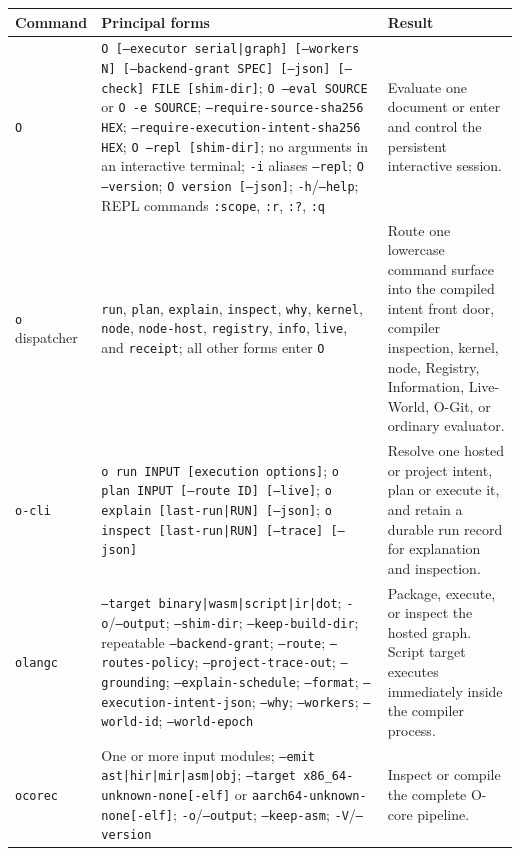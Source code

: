 \documentclass[11pt,oneside]{article}
\begin{document}
\begin{longtable}{P{0.18\textwidth} P{0.42\textwidth} P{0.32\textwidth}}
\toprule
\textbf{Command} & \textbf{Principal forms} & \textbf{Result} \\
\midrule
\endhead
\texttt{O} & \texttt{O [--executor serial|graph] [--workers N]
[--backend-grant SPEC] [--json] [--check] FILE [shim-dir]};
\texttt{O --eval SOURCE} or \texttt{O -e SOURCE};
\texttt{--require-source-sha256 HEX};
\texttt{--require-execution-intent-sha256 HEX};
\texttt{O --repl [shim-dir]}; no arguments in an interactive terminal;
\texttt{-i} aliases \texttt{--repl}; \texttt{O --version};
\texttt{O version [--json]}; \texttt{-h}/\texttt{--help}; REPL commands
\texttt{:scope}, \texttt{:r}, \texttt{:?}, \texttt{:q} &
Evaluate one document or enter and control the persistent interactive session. \\
\texttt{o} dispatcher &
\texttt{run}, \texttt{plan}, \texttt{explain}, \texttt{inspect},
\texttt{why}, \texttt{kernel}, \texttt{node}, \texttt{node-host},
\texttt{registry}, \texttt{info}, \texttt{live}, and \texttt{receipt};
all other forms enter \texttt{O} &
Route one lowercase command surface into the compiled intent front door,
compiler inspection, kernel, node, Registry, Information, Live-World, O-Git,
or ordinary evaluator. \\
\texttt{o-cli} &
\texttt{o run INPUT [execution options]};
\texttt{o plan INPUT [--route ID] [--live]};
\texttt{o explain [last-run|RUN] [--json]};
\texttt{o inspect [last-run|RUN] [--trace] [--json]} &
Resolve one hosted or project intent, plan or execute it, and retain a durable
run record for explanation and inspection. \\
\texttt{olangc} & \texttt{--target binary|wasm|script|ir|dot};
\texttt{-o}/\texttt{--output}; \texttt{--shim-dir};
\texttt{--keep-build-dir}; repeatable
\texttt{--backend-grant}; \texttt{--route}; \texttt{--routes-policy};
\texttt{--project-trace-out}; \texttt{--grounding};
\texttt{--explain-schedule}; \texttt{--format};
\texttt{--execution-intent-json}; \texttt{--why}; \texttt{--workers};
\texttt{--world-id}; \texttt{--world-epoch} &
Package, execute, or inspect the hosted graph. Script target executes
immediately inside the compiler process. \\
\texttt{ocorec} & One or more input modules; \texttt{--emit
ast|hir|mir|asm|obj}; \texttt{--target x86\_64-unknown-none[-elf]} or
\texttt{aarch64-unknown-none[-elf]}; \texttt{-o}/\texttt{--output};
\texttt{--keep-asm}; \texttt{-V}/\texttt{--version} &
Inspect or compile the complete O-core pipeline. \\

\end{longtable}
\end{document}
